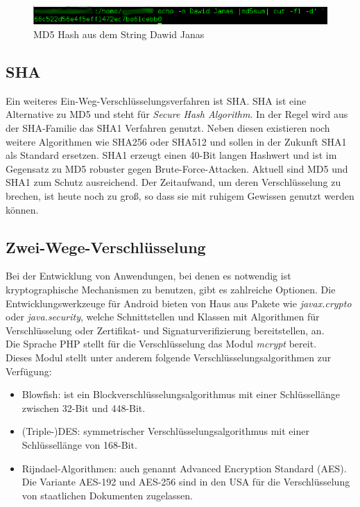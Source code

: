 \begin{figure}[h]
  \centering
  \includegraphics[scale=0.6]{fotos/kapitel3/md5sum.png}
  \caption{MD5 Hash aus dem String \dq Dawid Janas\dq{}}
 
\end{figure}

\subsection{SHA}
Ein weiteres Ein-Weg-Verschl\"usselungsverfahren ist SHA. 
SHA ist eine Alternative zu MD5 und steht f\"ur \emph{Secure Hash Algorithm}.
In der Regel wird aus der SHA-Familie das SHA1 Verfahren genutzt. 
Neben diesen existieren noch weitere Algorithmen wie SHA256 oder SHA512 und sollen in der Zukunft SHA1
als Standard ersetzen.
SHA1 erzeugt einen 40-Bit langen Hashwert und ist im Gegensatz zu MD5 robuster gegen Brute-Force-Attacken.
Aktuell sind MD5 und SHA1 zum Schutz ausreichend.
Der Zeitaufwand, um deren Verschl\"usselung zu brechen, ist heute noch zu gro\ss{}, so dass sie mit ruhigem Gewissen genutzt werden k\"onnen.\\

\subsection{Zwei-Wege-Verschl\"usselung}

Bei der Entwicklung von Anwendungen, bei denen es notwendig ist kryptographische Mechanismen zu benutzen, gibt es zahlreiche Optionen.
Die Entwicklungswerkzeuge f\"ur Android bieten von Haus aus Pakete wie \emph{javax.crypto} oder \emph{java.security},
welche Schnittstellen und Klassen mit Algorithmen f\"ur Verschl\"usselung oder Zertifikat- und Signaturverifizierung bereitstellen, an.\\

Die Sprache PHP stellt f\"ur die Verschl\"usselung das Modul \emph{mcrypt} bereit\cite[S. 510]{PHP_MySQL:01}.\\
Dieses Modul stellt unter anderem folgende Verschl\"usselungsalgorithmen zur Verf\"ugung:
\begin{itemize}
 \item Blowfish: ist ein Blockverschl\"usselungsalgorithmus mit einer Schl\"ussell\"ange zwischen 32-Bit und 448-Bit.
 \item (Triple-)DES: symmetrischer Verschl\"usselungsalgorithmus mit einer Schl\"ussell\"ange von 168-Bit.
 \item Rijndael-Algorithmen: auch genannt Advanced Encryption Standard (AES). 
 Die Variante AES-192 und AES-256 sind in den USA f\"ur die Verschl\"usselung von staatlichen Dokumenten zugelassen\cite{Sicherheit:05}.
 
\end{itemize}




